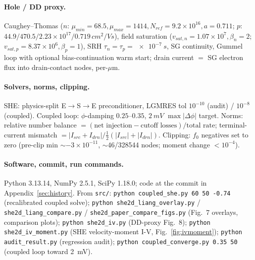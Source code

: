 \documentclass[11pt]{article}
\begin{document}
\paragraph{Hole / DD proxy.} Caughey--Thomas ($n$: $\mu_{min}{=}68.5,\mu_{max}{=}1414,
N_{ref}{=}9.2{\times}10^{16},a{=}0.711$; $p$: $44.9/470.5/2.23{\times}10^{17}/0.719\,\si{cm^2/Vs}$),
field saturation ($v_{sat,n}{=}1.07{\times}10^{7},\beta_n{=}2$; $v_{sat,p}{=}8.37{\times}10^{6},
\beta_p{=}1$), SRH $\tau_n{=}\tau_p{=}\SI{e-7}{s}$, SG continuity, Gummel loop with optional
bias-continuation warm start; drain current $=$ SG electron flux into drain-contact nodes, per-$\mu$m.

\paragraph{Solvers, norms, clipping.} SHE: physics-split E$\to$S$\to$E preconditioner, LGMRES tol
$10^{-10}$ (audit) / $10^{-8}$ (coupled). Coupled loop: $\phi$-damping $0.25$--$0.35$, $\SI{2}{mV}$
$\max|\Delta\phi|$ target. Norms: relative number balance $=(\text{net injection}-\text{cutoff
losses})/\text{total rate}$; terminal-current mismatch $=|I_{src}{+}I_{drn}|/\tfrac12(|I_{src}|{+}
|I_{drn}|)$. Clipping: $f_0$ negatives set to zero (pre-clip min $\sim-3\times10^{-11}$,
$\sim$46/328544 nodes; moment change $<10^{-4}$).

\paragraph{Software, commit, run commands.} Python 3.13.14, NumPy 2.5.1, SciPy 1.18.0; code at the
commit in Appendix~\ref{sec:history}. From \texttt{src/}: \texttt{python coupled\_she.py 60 50
-0.74} (recalibrated coupled solve); \texttt{python she2d\_liang\_overlay.py} /
\texttt{she2d\_liang\_compare.py} / \texttt{she2d\_paper\_compare\_figs.py} (Fig.~7 overlays,
comparison plots); \texttt{python she2d\_iv.py} (DD-proxy Fig.~8); \texttt{python she2d\_iv\_moment.py} (SHE
velocity-moment I-V, Fig.~\ref{fig:ivmoment}); \texttt{python audit\_result.py} (regression audit);
\texttt{python coupled\_converge.py 0.35 50} (coupled loop toward \SI{2}{mV}).
\end{document}
